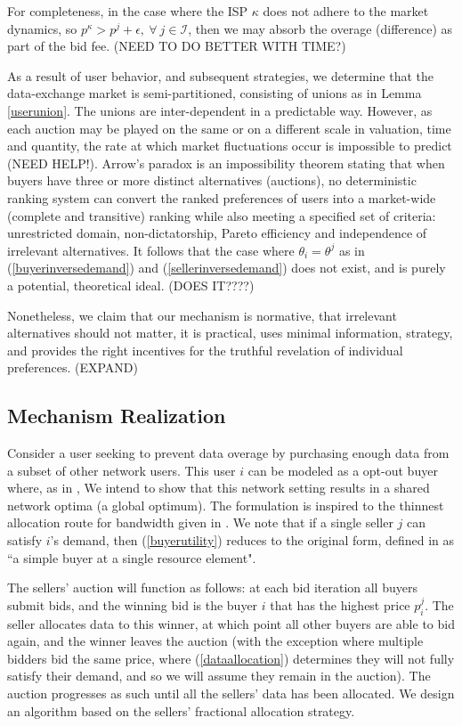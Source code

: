 \documentclass[12pt]{article}
\theoremstyle{definition}
\newcommand{\mcI}{\mathcal{I}}
\begin{document}
\begin{multicols}{2}
For completeness, in the case where the ISP $\kappa$ 
does not adhere to the market dynamics, so $p^\kappa > p^j +
\epsilon, \ \forall \ j \in\mcI$, then we may absorb the overage (difference) as part of the
bid fee.
(NEED TO DO BETTER WITH TIME?)

As a result of user behavior, and subsequent strategies, we determine that the data-exchange market is
semi-partitioned, consisting of unions as in Lemma \ref{userunion}. The unions are inter-dependent in a predictable way. However, as
each auction may be played on the same or on a different scale in
valuation, time and quantity, the rate at which market fluctuations occur is
impossible to predict (NEED HELP!). 
Arrow's paradox is an impossibility theorem stating that when buyers have three
or more distinct alternatives (auctions), no deterministic ranking system can
convert the ranked preferences of users into a market-wide (complete
and transitive) ranking while also meeting a specified set of criteria:
unrestricted domain, non-dictatorship, Pareto efficiency and independence of
irrelevant alternatives. It follows that the case where
$\theta_i = \theta^j$ as in (\ref{buyerinversedemand}) and
(\ref{sellerinversedemand}) does not exist, and is purely a potential,
theoretical ideal. (DOES IT????)

Nonetheless, we claim that our mechanism is normative, that irrelevant
alternatives should not matter, it is practical, uses minimal information,
strategy, and provides the right incentives for the truthful revelation of individual preferences. 
(EXPAND)

\subsection{Mechanism Realization}\label{realization}

Consider a user seeking to prevent
data overage by purchasing enough data from a subset of other network users.
This user $i$ can be modeled as a opt-out buyer where, as in \cite{semret},
We intend to show that this network setting results in a shared network optima (a
global optimum). The formulation is inspired to the thinnest allocation route for
bandwidth given in \cite{lazar}. We note that if a single seller $j$ can
satisfy $i$'s demand, then
(\ref{buyerutility}) reduces to the original form, defined in
\cite{semret} as ``a simple buyer at a single resource element".

The sellers' auction will function as follows: at each bid iteration all buyers
submit bids, and the winning bid is the buyer $i$ that has the highest price
$p_i^j$. The seller allocates
data to this winner, at which point all other buyers are able to bid again, and
the winner leaves the auction (with the exception where multiple bidders bid
the same price, where (\ref{dataallocation}) determines they will not fully
satisfy their demand, and so we will assume they remain in the auction). The auction progresses as such until all the
sellers' data has been allocated. We design an algorithm based on the sellers'
fractional allocation strategy.


\end{multicols}
\end{document}
